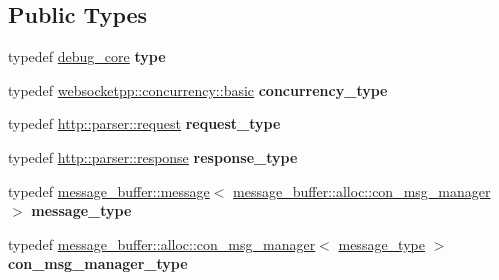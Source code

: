 \subsection*{Public Types}
\begin{DoxyCompactItemize}
\item 
\mbox{\label{structwebsocketpp_1_1config_1_1debug__core_a5c32a974103fef0bad45f0f66bf20e8e}} 
typedef \mbox{\hyperlink{structwebsocketpp_1_1config_1_1debug__core}{debug\+\_\+core}} {\bfseries type}
\item 
\mbox{\label{structwebsocketpp_1_1config_1_1debug__core_aada73b9183fc032c25178870dbb4d83d}} 
typedef \mbox{\hyperlink{classwebsocketpp_1_1concurrency_1_1basic}{websocketpp\+::concurrency\+::basic}} {\bfseries concurrency\+\_\+type}
\item 
\mbox{\label{structwebsocketpp_1_1config_1_1debug__core_a597de872d5a5b6e9bd2fa1af18ccbbc6}} 
typedef \mbox{\hyperlink{classwebsocketpp_1_1http_1_1parser_1_1request}{http\+::parser\+::request}} {\bfseries request\+\_\+type}
\item 
\mbox{\label{structwebsocketpp_1_1config_1_1debug__core_aa11255cb23f43afb8884bc464aa5c572}} 
typedef \mbox{\hyperlink{classwebsocketpp_1_1http_1_1parser_1_1response}{http\+::parser\+::response}} {\bfseries response\+\_\+type}
\item 
\mbox{\label{structwebsocketpp_1_1config_1_1debug__core_ac17c81ad59c265eed87e3e25944c9fbf}} 
typedef \mbox{\hyperlink{classwebsocketpp_1_1message__buffer_1_1message}{message\+\_\+buffer\+::message}}$<$ \mbox{\hyperlink{classwebsocketpp_1_1message__buffer_1_1alloc_1_1con__msg__manager}{message\+\_\+buffer\+::alloc\+::con\+\_\+msg\+\_\+manager}} $>$ {\bfseries message\+\_\+type}
\item 
\mbox{\label{structwebsocketpp_1_1config_1_1debug__core_a7054f79ccb00e2269e3c9fa1061126ac}} 
typedef \mbox{\hyperlink{classwebsocketpp_1_1message__buffer_1_1alloc_1_1con__msg__manager}{message\+\_\+buffer\+::alloc\+::con\+\_\+msg\+\_\+manager}}$<$ \mbox{\hyperlink{classwebsocketpp_1_1message__buffer_1_1message}{message\+\_\+type}} $>$ {\bfseries con\+\_\+msg\+\_\+manager\+\_\+type}

\end{DoxyCompactItemize}

